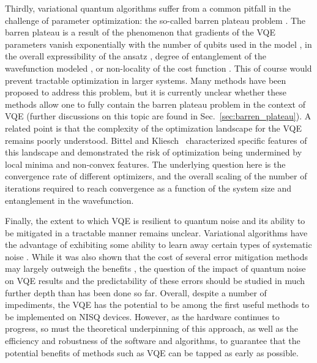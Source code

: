 Thirdly, variational quantum algorithms suffer from a common pitfall in the challenge of parameter optimization: the so-called barren plateau problem \cite{Wecker2015, McClean2018, Cerezo2021_BP}. The barren plateau is a result of the phenomenon that gradients of the VQE parameters vanish exponentially with the number of qubits used in the model \cite{McClean2018}, in the overall expressibility of the ansatz \cite{Holmes2016}, degree of entanglement of the wavefunction modeled \cite{OrtizMarrero2020, Patti2021}, or non-locality of the cost function \cite{Cerezo2021_BP, Uvarov2020, Sharma2020}. This of course would prevent tractable optimization in larger systems. Many methods have been proposed to address this problem, but it is currently unclear whether these methods allow one to fully contain the barren plateau problem in the context of VQE (further discussions on this topic are found in Sec.~\ref{sec:barren_plateau}). A related point is that the complexity of the optimization landscape for the VQE remains poorly understood. Bittel and Kliesch~\cite{Bittel2021} characterized specific features of this landscape and demonstrated the risk of optimization being undermined by local minima and non-convex features. The underlying question here is the convergence rate of different optimizers, and the overall scaling of the number of iterations required to reach convergence as a function of the system size and entanglement in the wavefunction. 

Finally, the extent to which VQE is resilient to quantum noise and its ability to be mitigated in a tractable manner remains unclear. Variational algorithms have the advantage of exhibiting some ability to learn away certain types of systematic noise \cite{Enrico2021EvaluatingNoiseResilience,Enrico2020NoiseInducedBreakingOfSymmetries}. While it was also shown that the cost of several error mitigation methods may largely outweigh the benefits \cite{RyujiFundamentalLimits2021}, the question of the impact of quantum noise on VQE results and the predictability of these errors should be studied in much further depth than has been done so far. Overall, despite a number of impediments, the VQE has the potential to be among the first useful methods to be implemented on NISQ devices. However, as the hardware continues to progress, so must the theoretical underpinning of this approach, as well as the efficiency and robustness of the software and algorithms, to guarantee that the potential benefits of methods such as VQE can be tapped as early as possible. 

